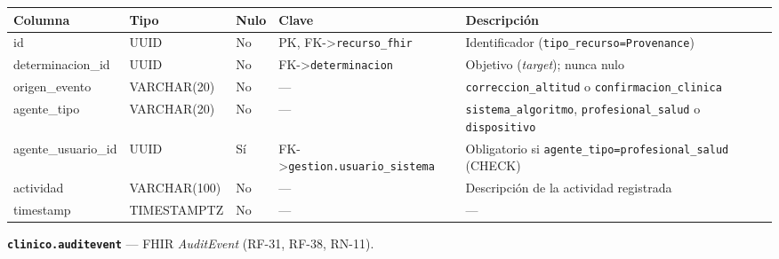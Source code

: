 \documentclass[11pt,a4paper]{article}
\begin{document}
{\small
\begin{longtable}[]{@{}
  >{\raggedright\arraybackslash}p{}
  >{\raggedright\arraybackslash}p{}
  >{\raggedright\arraybackslash}p{}
  >{\raggedright\arraybackslash}p{}
  >{\raggedright\arraybackslash}p{}@{}}
\toprule\noalign{}
\begin{minipage}[b]{\linewidth}\raggedright
Columna
\end{minipage} & \begin{minipage}[b]{\linewidth}\raggedright
Tipo
\end{minipage} & \begin{minipage}[b]{\linewidth}\raggedright
Nulo
\end{minipage} & \begin{minipage}[b]{\linewidth}\raggedright
Clave
\end{minipage} & \begin{minipage}[b]{\linewidth}\raggedright
Descripción
\end{minipage} \\
\midrule\noalign{}
\endhead
\bottomrule\noalign{}
\endlastfoot
id & UUID & No & PK, FK-\textgreater{}\texttt{recurso\_fhir} & Identificador (\texttt{tipo\_recurso=\textquotesingle{}Provenance\textquotesingle{}}) \\
determinacion\_id & UUID & No & FK-\textgreater{}\texttt{determinacion} & Objetivo (\emph{target}); nunca nulo \\
origen\_evento & VARCHAR(20) & No & --- & \texttt{correccion\_altitud} o \texttt{confirmacion\_clinica} \\
agente\_tipo & VARCHAR(20) & No & --- & \texttt{sistema\_algoritmo}, \texttt{profesional\_salud} o \texttt{dispositivo} \\
agente\_usuario\_id & UUID & Sí & FK-\textgreater{}\texttt{gestion.usuario\_sistema} & Obligatorio si \texttt{agente\_tipo=\textquotesingle{}profesional\_salud\textquotesingle{}} (CHECK) \\
actividad & VARCHAR(100) & No & --- & Descripción de la actividad registrada \\
timestamp & TIMESTAMPTZ & No & --- & --- \\
\end{longtable}
}

\textbf{\texttt{clinico.auditevent}} --- FHIR \emph{AuditEvent} (RF-31, RF-38, RN-11).
\end{document}
